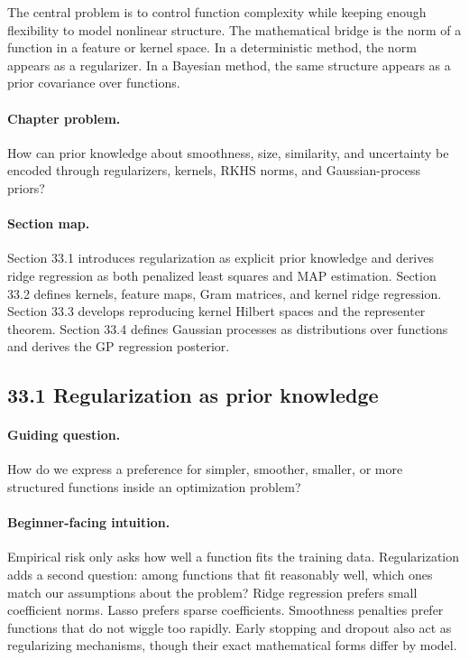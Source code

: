 The central problem is to control function complexity while keeping enough flexibility to model nonlinear structure. The mathematical bridge is the norm of a function in a feature or kernel space. In a deterministic method, the norm appears as a regularizer. In a Bayesian method, the same structure appears as a prior covariance over functions.

\paragraph{Chapter problem.}
How can prior knowledge about smoothness, size, similarity, and uncertainty be encoded through regularizers, kernels, RKHS norms, and Gaussian-process priors?

\paragraph{Section map.}
Section 33.1 introduces regularization as explicit prior knowledge and derives ridge regression as both penalized least squares and MAP estimation. Section 33.2 defines kernels, feature maps, Gram matrices, and kernel ridge regression. Section 33.3 develops reproducing kernel Hilbert spaces and the representer theorem. Section 33.4 defines Gaussian processes as distributions over functions and derives the GP regression posterior.

\subsection{33.1 Regularization as prior knowledge}

\paragraph{Guiding question.}
How do we express a preference for simpler, smoother, smaller, or more structured functions inside an optimization problem?

\paragraph{Beginner-facing intuition.}
Empirical risk only asks how well a function fits the training data. Regularization adds a second question: among functions that fit reasonably well, which ones match our assumptions about the problem? Ridge regression prefers small coefficient norms. Lasso prefers sparse coefficients. Smoothness penalties prefer functions that do not wiggle too rapidly. Early stopping and dropout also act as regularizing mechanisms, though their exact mathematical forms differ by model.

